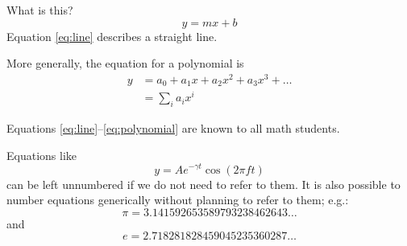 What is this? \begin{equation} y = mx + b \label{eq:line}\end{equation}
Equation \ref{eq:line} describes a straight line.

More generally, the equation for a polynomial is
\begin{equation} \begin{aligned}
     y &= a_0 + a_1 x + a_2 x^2 + a_3 x^3 + \dots \\
     &= \sum_i a_i x^i
   \end{aligned}
\label{eq:polynomial}\end{equation}

Equations \ref{eq:line}--\ref{eq:polynomial} are known to all math
students.

Equations like \[ y = A e^{-\gamma t}\cos(2\pi f t) \] can be left
unnumbered if we do not need to refer to them. It is also possible to
number equations generically without planning to refer to them; e.g.:
\begin{equation} \pi = 3.141592653589793238462643\dots \label{eq:__6943075502524592249__}\end{equation}
and
\begin{equation} e =   2.718281828459045235360287\dots \label{eq:__-2136475774652521989__}\end{equation}
